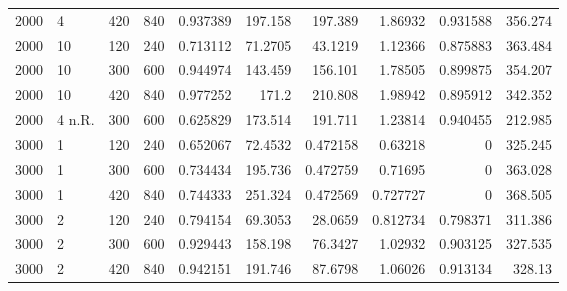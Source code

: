 \begin{tabular}{rlrrrrrrrr}
       2000 & 4          &            420 &             840 &              0.937389 &                197.158  &              197.389    &          1.86932  &            0.931588 &            356.274 \\
       2000 & 10         &            120 &             240 &              0.713112 &                 71.2705 &               43.1219   &          1.12366  &            0.875883 &            363.484 \\
       2000 & 10         &            300 &             600 &              0.944974 &                143.459  &              156.101    &          1.78505  &            0.899875 &            354.207 \\
       2000 & 10         &            420 &             840 &              0.977252 &                171.2    &              210.808    &          1.98942  &            0.895912 &            342.352 \\
       2000 & 4 n.R.     &            300 &             600 &              0.625829 &                173.514  &              191.711    &          1.23814  &            0.940455 &            212.985 \\
       3000 & 1          &            120 &             240 &              0.652067 &                 72.4532 &                0.472158 &          0.63218  &            0        &            325.245 \\
       3000 & 1          &            300 &             600 &              0.734434 &                195.736  &                0.472759 &          0.71695  &            0        &            363.028 \\
       3000 & 1          &            420 &             840 &              0.744333 &                251.324  &                0.472569 &          0.727727 &            0        &            368.505 \\
       3000 & 2          &            120 &             240 &              0.794154 &                 69.3053 &               28.0659   &          0.812734 &            0.798371 &            311.386 \\
       3000 & 2          &            300 &             600 &              0.929443 &                158.198  &               76.3427   &          1.02932  &            0.903125 &            327.535 \\
       3000 & 2          &            420 &             840 &              0.942151 &                191.746  &               87.6798   &          1.06026  &            0.913134 &            328.13  \\

\end{tabular}
